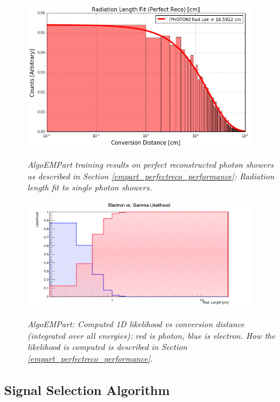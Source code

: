\begin{figure}[ht!]
\centering
\includegraphics[width=0.9\textwidth]{Figures/EMPartTraining/mc_trained/RadLength_Selected_g.png}\\
\caption{\textit{AlgoEMPart training results on perfect reconstructed photon showers as described in Section \ref{empart_perfectreco_performance}: Radiation length fit to single photon showers.}}
\label{empart_perfectreco_performance_fig7}
\end{figure}


\begin{figure}[ht!]
\centering
\includegraphics[width=0.9\textwidth]{Figures/EMPartTraining/mc_trained/Likelihood_radLen.png}\\
\caption{\textit{AlgoEMPart: Computed 1D likelihood vs conversion distance (integrated over all energies): red is photon, blue is electron. How the likelihood is computed is described in Section \ref{empart_perfectreco_performance}.}}
\label{empart_perfectreco_performance_fig5}
\end{figure}






\subsection{Signal Selection Algorithm}

